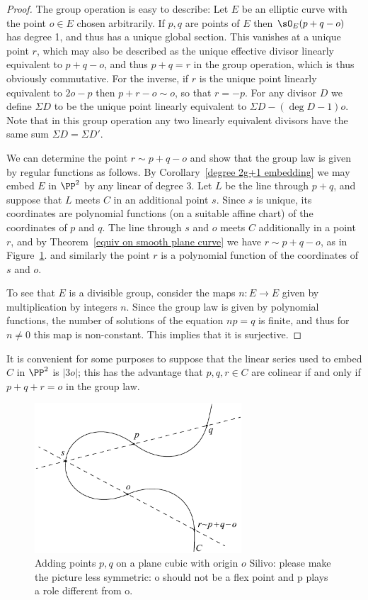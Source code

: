 \begin{proof}
 The group operation is easy to describe:
Let $E$ be an elliptic curve with the point $o\in E$ chosen arbitrarily. If $p,q$ are points of $E$ then $\sO_E(p+q-o)$ has degree 1, and
thus has a unique global section. This vanishes at a unique point $r$, which may also be described as the unique
effective divisor linearly equivalent to $p+q-o$, and thus 
$p+q = r$ in the group operation, which is thus obviously commutative. For the inverse, if $r$ is the  unique point
linearly equivalent to $2o-p$ then $p+r-o\sim o$, so that $r=-p$. For any divisor $D$
we define $\Sigma D$ to be the unique point linearly equivalent to $\Sigma D-(\deg D-1)o$.
Note that in this group operation any two linearly
equivalent divisors have the same sum $\Sigma D = \Sigma D'$.

We can determine the point $r\sim p+q-o$ and show that the group law is given by regular functions
as follows. By Corollary~\ref{degree 2g+1 embedding} we may embed $E$ in $\PP^2$ by any linear
of degree 3.  Let $L$ be the line through $p+q$, and suppose that
$L$ meets $C$ in an additional point $s$. Since $s$ is unique, its coordinates are polynomial functions
(on a suitable affine chart) of the coordinates of $p$ and $q$. The line through $s$ and $o$ meets $C$ additionally in a point $r$,
and by Theorem~\ref{equiv on smooth plane curve} we have $r\sim p+q-o$, as in Figure~\ref{group law on cubic}.
and similarly the point $r$ is a polynomial function of the coordinates of $s$ and $o$.

To see that $E$ is a divisible group, consider the maps $n: E\to E$ given by multiplication by integers $n$. Since the
group law is given by polynomial functions, the number of solutions of the equation $np = q$ is finite, and thus
for $n\neq 0$ this map is non-constant. This implies that it is surjective.
\end{proof}

It is convenient for some purposes to suppose that the linear series used to embed $C$ in $\PP^2$ is $|3o|$; this
has the advantage that $p,q,r\in C$ are colinear if and only if $p+q+r =o$ in the group law.

\begin{figure}\label{group law on cubic}
\centerline {\includegraphics[height=2.2in]{"main/Fig03-2"}}
 \caption{Adding points $p, q$ on a plane cubic with origin $o$
 {Silivo: please make the picture less symmetric: o should not be a flex point and p plays a role different from o.}}
\end{figure}

